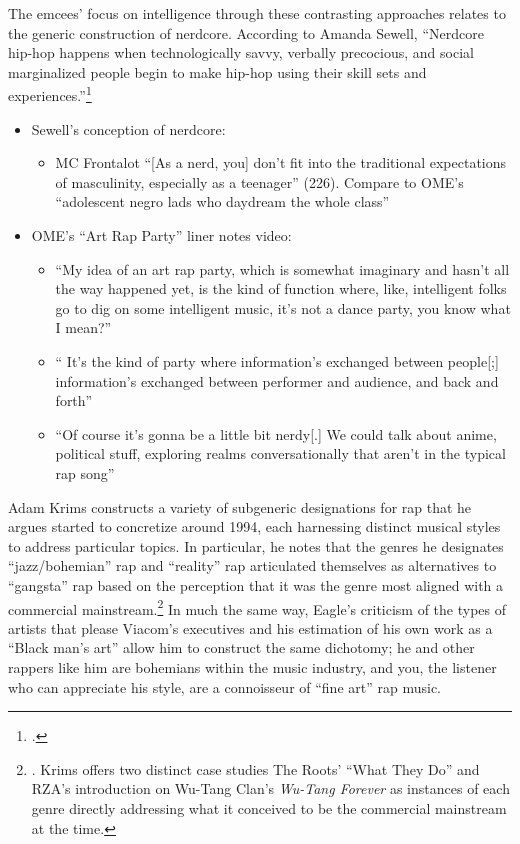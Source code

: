The emcees' focus on intelligence through these contrasting approaches relates to the generic construction of
nerdcore. According to Amanda Sewell, ``Nerdcore hip-hop happens when technologically savvy, verbally precocious,
and social marginalized people begin to make hip-hop using their skill sets and experiences.''\footnote{
    \autocite[223]{amandasewellNerdcoreHiphop2015}.}
   \begin{itemize}
    \item Sewell's conception of nerdcore:
            \begin{itemize}
                \item MC Frontalot ``[As a nerd, you] don't fit into the traditional expectations of 
                masculinity, especially as a teenager'' (226). Compare to OME's ``adolescent negro lads who 
                daydream the whole class''
            \end{itemize}
        \item OME's ``Art Rap Party'' liner notes video:
            \begin{itemize}
                \item ``My idea of an art rap party, which is somewhat imaginary and hasn't all the way
                happened yet, is the kind of function where, like, intelligent folks go to dig on some
                intelligent music, \textellipsis it's not a dance party, you know what I mean?''
                \item ``  It's the kind of party where information's exchanged between people[;] 
                information's exchanged between performer and audience, and back and forth'' 
                \item ``Of course it's gonna be a little bit nerdy[.] \textellipsis We could talk about 
                anime, \textellipsis political stuff, exploring realms conversationally that aren't in the 
                typical rap song''
            \end{itemize}
    \end{itemize}

Adam Krims constructs a variety of subgeneric designations for rap that he argues started to concretize
around 1994, each harnessing distinct musical styles to address particular topics. In particular, he 
notes that the genres he designates ``jazz/bohemian'' rap and ``reality'' rap articulated themselves 
as alternatives  to ``gangsta'' rap based on the perception that it was the genre most aligned with
a commercial mainstream.\footnote{
    \autocite[64--65]{adamkrimsRapMusicPoetics2000}. Krims offers two distinct case studies\textemdash
    The Roots' ``What They Do'' and RZA's introduction on Wu-Tang Clan's \textit{Wu-Tang Forever}\textemdash 
    as instances of each genre directly addressing what it conceived to be the commercial mainstream 
    at the time.}
In much the same way, Eagle's criticism of the types of artists that please Viacom's executives and his 
estimation of his own work as a ``Black man's art'' allow him to construct the same dichotomy; he and
other rappers like him are bohemians within the music industry, and you, the listener who can appreciate
his style, are a connoisseur of ``fine art'' rap music.

